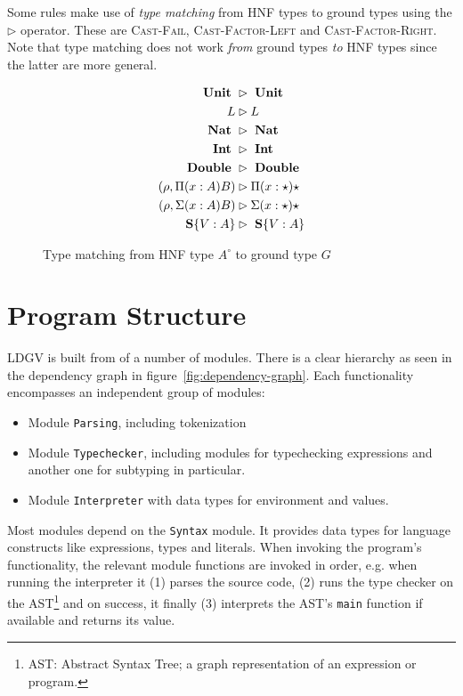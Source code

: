 Some rules make use of \emph{type matching} from HNF types to ground types using the $\rhd$ operator. These are \textsc{Cast-Fail}, \textsc{Cast-Factor-Left} and \textsc{Cast-Factor-Right}. Note that type matching does not work \emph{from} ground types \emph{to} HNF types since the latter are more general.

\begin{figure}
\begin{align*}
\text{ \textbf{Unit} } &\rhd \text{ \textbf{Unit} } \\
L &\rhd L \\
\text{ \textbf{Nat} } &\rhd \text{ \textbf{Nat} } \\
\text{ \textbf{Int} } &\rhd \text{ \textbf{Int} } \\
\text{ \textbf{Double} } &\rhd \text{ \textbf{Double} } \\
(\rho, \Pi (x:A)B) &\rhd \Pi(x:\star)\star \\
(\rho, \Sigma (x:A)B) &\rhd \Sigma(x:\star)\star \\
\text{ \textbf{S}} \{ V:A \} &\rhd \text{ \textbf{S}} \{ V : A \}
\end{align*}
\caption{Type matching from HNF type $A^\circ$ to ground type $G$}
\label{fig:ccldlc-type-matching}
\end{figure}

\section{Program Structure}\label{sec:program-structure}

LDGV is built from of a number of modules. There is a clear hierarchy as seen in the dependency graph in figure~\ref{fig:dependency-graph}. Each functionality encompasses an independent group of modules:

\begin{itemize}
 \item Module \texttt{Parsing}, including tokenization
 \item Module \texttt{Typechecker}, including modules for typechecking expressions and another one for subtyping in particular.
 \item Module \texttt{Interpreter} with data types for environment and values.
\end{itemize}

Most modules depend on the \texttt{Syntax} module. It provides data types for language constructs like expressions, types and literals. When invoking the program's functionality, the relevant module functions are invoked in order, e.g. when running the interpreter it (1) parses the source code, (2) runs the type checker on the AST\footnote{AST: Abstract Syntax Tree; a graph representation of an expression or program.} and on success, it finally (3) interprets the AST's \texttt{main} function if available and returns its value. 

